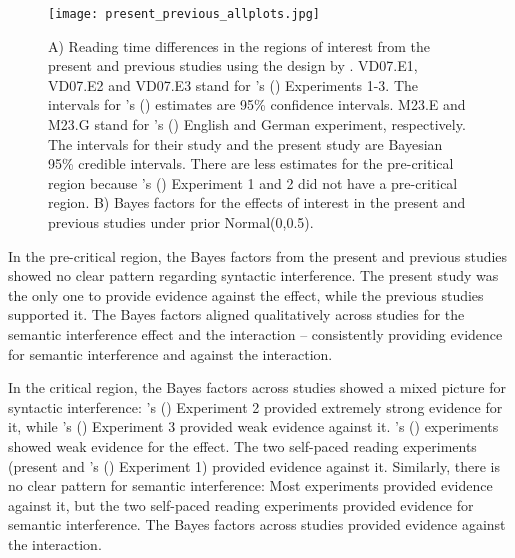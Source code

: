 \documentclass[review,preprint,12pt,authoryear,floatsintext]{elsarticle}
\begin{document}
{{\begin{figure}
    \caption{A) Reading time differences in the regions of interest from the present and previous studies using the design by \cite{vandyke07}. VD07.E1, VD07.E2 and VD07.E3 stand for \citeauthor{vandyke07}'s (\citeyear{vandyke07}) Experiments 1-3. The intervals for \citeauthor{vandyke07}'s (\citeyear{vandyke07}) estimates are 95\% confidence intervals. M23.E and M23.G stand for \citeauthor{mertzen}'s (\citeyear{mertzen}) English and German experiment, respectively. The intervals for their study and the present study are Bayesian 95\% credible intervals. There are less estimates for the pre-critical region because \citeauthor{vandyke07}'s (\citeyear{vandyke07}) Experiment 1 and 2 did not have a pre-critical region. B) Bayes factors for the effects of interest in the present and previous studies under prior Normal(0,0.5).}
    \label{fig:previous_vs_present}
    \centering
    \texttt{[image: present\_previous\_allplots.jpg]}
\end{figure}
\clearpage

In the pre-critical region, the Bayes factors from the present and previous studies showed no clear pattern regarding syntactic interference. The present study was the only one to provide evidence against the effect, while the previous studies supported it. The Bayes factors aligned qualitatively across studies for the semantic interference effect and the interaction -- consistently providing evidence for semantic interference and against the interaction.

In the critical region, the Bayes factors across studies showed a mixed picture for syntactic interference: \citeauthor{vandyke07}'s (\citeyear{vandyke07}) Experiment 2 provided extremely strong evidence for it, while \citeauthor{vandyke07}'s (\citeyear{vandyke07}) Experiment 3 provided weak evidence against it. \citeauthor{mertzen}'s (\citeyear{mertzen}) experiments showed weak evidence for the effect. The two self-paced reading experiments (present and \citeauthor{vandyke07}'s (\citeyear{vandyke07}) Experiment 1) provided evidence against it. Similarly, there is no clear pattern for semantic interference: Most experiments provided evidence against it, but the two self-paced reading experiments provided evidence for semantic interference. The Bayes factors across studies provided evidence against the interaction.

}}
\end{document}
